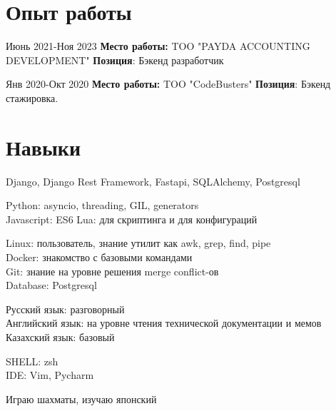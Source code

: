 \documentclass[10pt]{article} %
\begin{document}
\section{Опыт работы}

\job
{Июнь 2021-}{Ноя 2023}
{\textbf{Место работы: }TOO "PAYDA ACCOUNTING DEVELOPMENT"}
{\textbf{Позиция}: Бэкенд разработчик}

\job
{Янв 2020-}{Окт 2020}
{\textbf{Место работы: }TOO "CodeBusters" }
{\textbf{Позиция}: Бэкенд стажировка. }




\section{Навыки}

{
  Django, Django Rest Framework, Fastapi, SQLAlchemy, Postgresql
}

{
  Python: asyncio, threading, GIL, generators\\
  Javascript: ES6
  Lua: для скриптинга и для конфигураций
}

{
  Linux: пользователь, знание утилит как awk, grep, find, pipe\\
  Docker: знакомство с базовыми командами\\
  Git: знание на уровне решения merge conflict-ов\\
  Database: Postgresql
}

{
  Русский язык: разговорный\\
  Английский язык: на уровне чтения технической документации и мемов\\
  Казахский язык: базовый
}


{
  SHELL: zsh\\
  IDE: Vim, Pycharm
}

{
  Играю шахматы, изучаю японский
}
\end{document}

